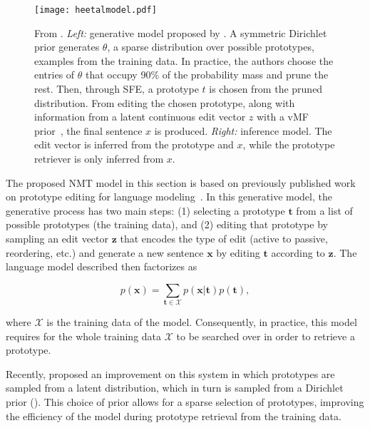
\begin{figure}[t]
    \centering
    \texttt{[image: heetalmodel.pdf]}
    \caption{From \citet{he2020LearningSparsePrototypes}. {\it Left:}
    generative model proposed by
    \citet{he2020LearningSparsePrototypes}. A symmetric Dirichlet
    prior generates $\theta$, a sparse distribution over possible
    prototypes, \ie examples from the training data. In practice, the
    authors choose the entries of $\theta$ that occupy 90\% of the
    probability mass and prune the rest. Then, through SFE, a
    prototype $t$ is chosen from the pruned distribution. From
    editing the chosen prototype, along with information from a
    latent continuous edit vector $z$ with a vMF
    prior~\citep{s-vae18}, the final sentence
    $x$ is produced. {\it Right:} inference model. The edit
    vector is inferred from the prototype and $x$, while the
    prototype retriever is only inferred from $x$.
    \label{fig:he2020LearningSparsePrototypes}}
\end{figure}

The proposed NMT model in this section is based on previously
published work on prototype editing for language
modeling~\citep{guu2018GeneratingSentencesEditing,
    he2020LearningSparsePrototypes}. In this generative model, the
generative process has two main steps: (1) selecting a prototype
$\bm{t}$ from a list of possible prototypes (\eg the training data),
and (2) editing that prototype by sampling an edit vector $\bm{z}$
that encodes the type of edit (\eg active to passive, reordering,
etc.) and generate a new sentence $\bm{x}$ by editing $\bm{t}$
according to $\bm{z}$. The language model described then factorizes
as

\begin{equation}
    p(\bm{x}) = \sum_{\bm{t} \in \mathcal{X}} p(\bm{x} | \bm{t}) p(\bm{t}),
\end{equation}

\noindent where $\mathcal{X}$ is the training data of the model.
Consequently, in practice, this model requires for the whole training
data $\mathcal{X}$ to be searched over in order to retrieve a
prototype.

Recently, \citet{he2020LearningSparsePrototypes} proposed an
improvement on this system in which prototypes are sampled from a
latent distribution, which in turn is sampled from a Dirichlet prior
(). This choice of prior
allows for a sparse selection of prototypes, improving the efficiency
of the model during prototype retrieval from the training data.

